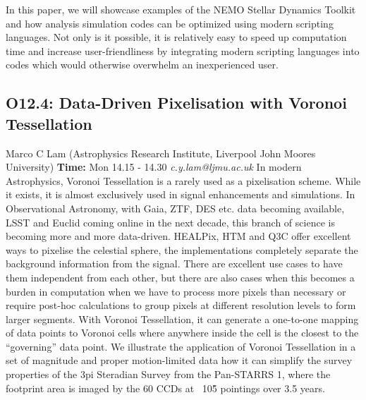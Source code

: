 \documentclass{report}
\begin{document}
In this paper, we will showcase examples of the NEMO Stellar Dynamics Toolkit and how analysis simulation codes can be optimized using modern scripting languages.  Not only is it possible, it is relatively easy to speed up computation time and increase user-friendliness by integrating modern scripting languages into codes which would otherwise overwhelm an inexperienced user.\newline
\newpage
\subsection*{O12.4: Data-Driven Pixelisation with Voronoi Tessellation}
\bigskip
Marco C Lam (Astrophysics Research Institute, Liverpool John Moores University) \newline   \newline   \newline   \newline  \newline  \newline\newline
{\bf Time:} Mon 14.15 - 14.30\newline
\newline
{\it c.y.lam@ljmu.ac.uk}\newline
\newline\newline
In modern Astrophysics, Voronoi Tessellation is a rarely used as a
pixelisation scheme. While it exists, it is almost exclusively used in
signal enhancements and simulations. In Observational Astronomy, with
Gaia, ZTF, DES etc. data becoming available, LSST and Euclid coming
online in the next decade, this branch of science is becoming more and
more data-driven. HEALPix, HTM and Q3C offer excellent ways to
pixelise the celestial sphere, the implementations completely separate
the background information from the signal. There are excellent use
cases to have them independent from each other, but there are also
cases when this becomes a burden in computation when we have to
process more pixels than necessary or require post-hoc calculations to
group pixels at different resolution levels to form larger segments.
With Voronoi Tessellation, it can generate a one-to-one mapping of
data points to Voronoi cells where anywhere inside the cell is the
closest to the “governing” data point. We illustrate the application
of Voronoi Tessellation in a set of magnitude and proper
motion-limited data how it can simplify the survey properties of the
3pi Steradian Survey from the Pan-STARRS 1, where the footprint area
is imaged by the 60 CCDs at ~10\^5 pointings over 3.5 years.\newline
\newpage
\end{document}
